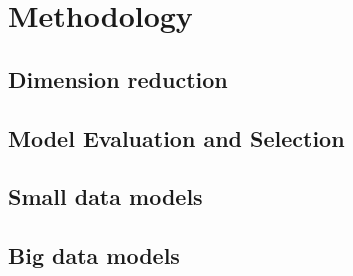 \section{Methodology}
\subsection{Dimension reduction}

\subsection{Model Evaluation and Selection}

\subsection{Small data models}

\subsection{Big data models}